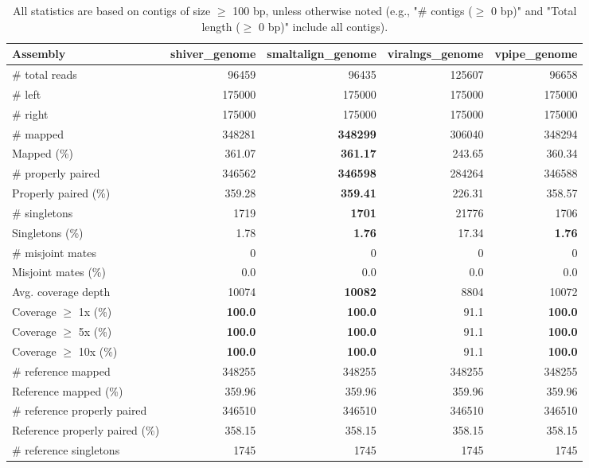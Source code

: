 \documentclass[12pt,a4paper]{article}
\begin{document}
\begin{table}[ht]
\begin{center}
\caption{All statistics are based on contigs of size $\geq$ 100 bp, unless otherwise noted (e.g., "\# contigs ($\geq$ 0 bp)" and "Total length ($\geq$ 0 bp)" include all contigs).}
\begin{tabular}{|l*{4}{|r}|}
\hline
Assembly & shiver\_genome & smaltalign\_genome & viralngs\_genome & vpipe\_genome \\ \hline
\# total reads & 96459 & 96435 & 125607 & 96658 \\ \hline
\# left & 175000 & 175000 & 175000 & 175000 \\ \hline
\# right & 175000 & 175000 & 175000 & 175000 \\ \hline
\# mapped & 348281 & {\bf 348299} & 306040 & 348294 \\ \hline
Mapped (\%) & 361.07 & {\bf 361.17} & 243.65 & 360.34 \\ \hline
\# properly paired & 346562 & {\bf 346598} & 284264 & 346588 \\ \hline
Properly paired (\%) & 359.28 & {\bf 359.41} & 226.31 & 358.57 \\ \hline
\# singletons & 1719 & {\bf 1701} & 21776 & 1706 \\ \hline
Singletons (\%) & 1.78 & {\bf 1.76} & 17.34 & {\bf 1.76} \\ \hline
\# misjoint mates & 0 & 0 & 0 & 0 \\ \hline
Misjoint mates (\%) & 0.0 & 0.0 & 0.0 & 0.0 \\ \hline
Avg. coverage depth & 10074 & {\bf 10082} & 8804 & 10072 \\ \hline
Coverage $\geq$ 1x (\%) & {\bf 100.0} & {\bf 100.0} & 91.1 & {\bf 100.0} \\ \hline
Coverage $\geq$ 5x (\%) & {\bf 100.0} & {\bf 100.0} & 91.1 & {\bf 100.0} \\ \hline
Coverage $\geq$ 10x (\%) & {\bf 100.0} & {\bf 100.0} & 91.1 & {\bf 100.0} \\ \hline
\# reference mapped & 348255 & 348255 & 348255 & 348255 \\ \hline
Reference mapped (\%) & 359.96 & 359.96 & 359.96 & 359.96 \\ \hline
\# reference properly paired & 346510 & 346510 & 346510 & 346510 \\ \hline
Reference properly paired (\%) & 358.15 & 358.15 & 358.15 & 358.15 \\ \hline
\# reference singletons & 1745 & 1745 & 1745 & 1745 \\ \hline

\end{tabular}
\end{center}
\end{table}
\end{document}
